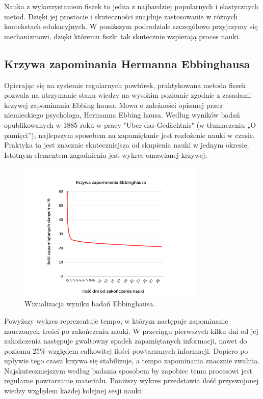 Nauka z wykorzystaniem fiszek to jedna z najbardziej popularnych i elastycznych metod. Dzięki jej prostocie i skuteczności znajduje zastosowanie w różnych kontekstach edukacyjnych. W poniższym podrodziale szczegółowo przyjrzymy się mechanizmowi, dzięki któremu fiszki tak skutecznie wspierają proces nauki.


\subsection{Krzywa zapominania Hermanna Ebbinghausa}

Opierając się na systemie regularnych powtórek, praktykowana metoda fiszek pozwala na utrzymanie stanu wiedzy na wysokim poziomie zgodnie z zasadami krzywej zapominania Ebbing hausa. Mowa o zależności opisanej przez niemieckiego psychologa, Hermanna Ebbing hausa. Według wyników badań opublikowanych w 1885 roku w pracy "Uber das Gedächtnis"\cite{ebbinghausMemoryCurve}  (w tłumaczeniu „O pamięci”), najlepszym sposobem na zapamiętanie jest rozłożenie nauki w czasie. Praktyka ta jest znacznie skuteczniejsza od skupienia nauki w jednym okresie. Istotnym elementem zagadnienia jest wykres omawianej krzywej:

\begin{figure}[H]
    \centering
    \includegraphics[width=0.8\textwidth]{chapters/chapter_2/krzywa1.png}
    \caption{Wizualizacja wyniku badań Ebbinghausa.}
    \label{img:krzywa1}
\end{figure}

Powyższy wykres reprezentuje tempo, w którym następuje zapominanie nauczonych treści po zakończeniu nauki. W przeciągu pierwszych kilku dni od jej zakończenia następuje gwałtowny spadek zapamiętanych informacji, nawet do poziomu 25\% względem całkowitej ilości powtarzanych informacji. Dopiero po upływie tego czasu krzywa się stabilizuje, a tempo zapominania znacznie zwalnia. Najskuteczniejszym według badania sposobem by zapobiec temu procesowi jest regularne powtarzanie materiału. Poniższy wykres przedstawia ilość przyswojonej wiedzy względem każdej kolejnej sesji nauki:

